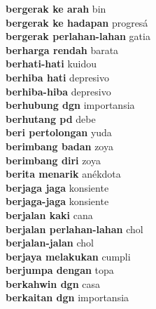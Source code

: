 \textbf{ bergerak ke arah  } bin \\
\textbf{ bergerak ke hadapan  } progresá \\
\textbf{ bergerak perlahan-lahan  } gatia \\
\textbf{ berharga rendah  } barata \\
\textbf{ berhati-hati  } kuidou \\
\textbf{ berhiba hati  } depresivo \\
\textbf{ berhiba-hiba  } depresivo \\
\textbf{ berhubung dgn  } importansia \\
\textbf{ berhutang pd  } debe \\
\textbf{ beri pertolongan  } yuda \\
\textbf{ berimbang badan  } zoya \\
\textbf{ berimbang diri  } zoya \\
\textbf{ berita menarik  } anékdota \\
\textbf{ berjaga jaga  } konsiente \\
\textbf{ berjaga-jaga  } konsiente \\
\textbf{ berjalan kaki  } cana \\
\textbf{ berjalan perlahan-lahan  } chol \\
\textbf{ berjalan-jalan  } chol \\
\textbf{ berjaya melakukan  } cumpli \\
\textbf{ berjumpa dengan  } topa \\
\textbf{ berkahwin dgn  } casa \\
\textbf{ berkaitan dgn  } importansia \\
